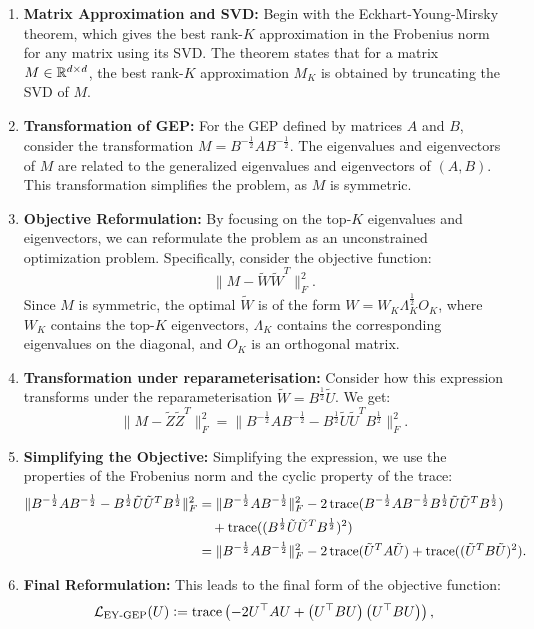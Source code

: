 \begin{enumerate}
    \item \textbf{Matrix Approximation and SVD:} Begin with the Eckhart-Young-Mirsky theorem, which gives the best rank-$K$ approximation in the Frobenius norm for any matrix using its SVD. The theorem states that for a matrix \(M \in \mathbb{R}^{d \times d}\), the best rank-$K$ approximation \(M_K\) is obtained by truncating the SVD of \(M\).
    
    \item \textbf{Transformation of GEP:} For the GEP defined by matrices \(A\) and \(B\), consider the transformation \(M = B^{-\frac{1}{2}} A B^{-\frac{1}{2}}\). The eigenvalues and eigenvectors of \(M\) are related to the generalized eigenvalues and eigenvectors of \((A,B)\). This transformation simplifies the problem, as \(M\) is symmetric.

    \item \textbf{Objective Reformulation:} By focusing on the top-$K$ eigenvalues and eigenvectors, we can reformulate the problem as an unconstrained optimization problem. Specifically, consider the objective function:
    \[
    \| M - \tilde{W} \tilde{W}^T \|_F^2.
    \]
    Since \(M\) is symmetric, the optimal \(\tilde{W}\) is of the form \(W = W_K \Lambda_K^{\frac{1}{2}} O_K\), where \(W_K\) contains the top-$K$ eigenvectors, \(\Lambda_K\) contains the corresponding eigenvalues on the diagonal, and \(O_K\) is an orthogonal matrix.

    \item \textbf{Transformation under reparameterisation:} Consider how this expression transforms under the reparameterisation \(\tilde{W} = B^{\frac{1}{2}} \tilde{U}\). We get:
    \[
    \| M - \tilde{Z} \tilde{Z}^T \|_F^2 = \| B^{-\frac{1}{2}} A B^{-\frac{1}{2}} - B^{\frac{1}{2}} \tilde{U} \tilde{U}^T B^{\frac{1}{2}} \|_F^2.
    \]

    \item \textbf{Simplifying the Objective:} Simplifying the expression, we use the properties of the Frobenius norm and the cyclic property of the trace:
    \begin{align*}
        \| B^{-\frac{1}{2}} A B^{-\frac{1}{2}} - B^{\frac{1}{2}} \tilde{U} \tilde{U}^T B^{\frac{1}{2}} \|_F^2 &= \| B^{-\frac{1}{2}} A B^{-\frac{1}{2}} \|_F^2 - 2 \operatorname{trace}(B^{-\frac{1}{2}} A B^{-\frac{1}{2}} B^{\frac{1}{2}} \tilde{U} \tilde{U}^T B^{\frac{1}{2}}) \\
        &\quad + \operatorname{trace}((B^{\frac{1}{2}} \tilde{U} \tilde{U}^T B^{\frac{1}{2}})^2) \\
        &= \| B^{-\frac{1}{2}} A B^{-\frac{1}{2}} \|_F^2 - 2 \operatorname{trace}(\tilde{U}^T A \tilde{U}) + \operatorname{trace}((\tilde{U}^T B \tilde{U})^2).
    \end{align*}

    \item \textbf{Final Reformulation:} This leads to the final form of the objective function:
    \[
    \mathcal{L}_\text{EY-GEP}(U) \vcentcolon= \operatorname{trace} \left( - 2U^\top A U + \left(U^\top B U\right) \left(U^\top B U\right) \right),
    \]
\end{enumerate}


